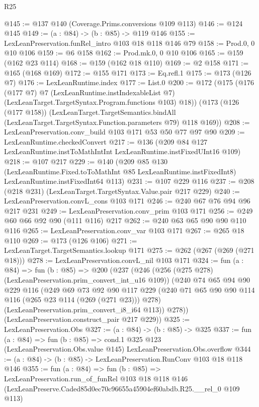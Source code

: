 \begin{lexlean}{R25}
\begin{coremodule}
@145 := @137 @140 (Coverage.Prims.conversions @109 @113)
@146 := @124 @145
@149 := (a : @84) -> (b : @85) -> @119 @146
@155 := LexLeanPreservation.funRel_intro @103 @18 @118 @146 @79
@158 := Prod.{0, 0} @10 @106
@159 := @6 @158
@162 := Prod.mk.{0, 0} @10 @106
@165 := @159 (@162 @23 @114)
@168 := @159 (@162 @18 @110)
@169 := @2 @158
@171 := @165 (@168 @169)
@172 := @155 @171
@173 := Eq.refl.{1}
@175 := @173 (@126 @7)
@176 := LexLeanRuntime.index
@177 := List.{0}
@200 := @172
    (@175
      (@176
        (@177 @7)
        @7
        (LexLeanRuntime.instIndexableList @7)
        (LexLeanTarget.TargetSyntax.Program.functions @103)
        @18))
    (@173
      (@126 (@177 @158))
      (LexLeanTarget.TargetSemantics.bindAll
        (LexLeanTarget.TargetSyntax.Function.parameters @79)
        @118
        @169))
@208 := LexLeanPreservation.conv_build @103 @171 @53 @50 @77 @97 @90
@209 := LexLeanRuntime.checkedConvert
@217 := @136 (@209 @84 @127 LexLeanRuntime.instToMathIntInt LexLeanRuntime.instFixedUInt16 @109)
@218 := @107 @217
@229 := @140
    (@209
      @85
      @130
      (LexLeanRuntime.Fixed.toToMathInt @85 LexLeanRuntime.instFixedInt8)
      LexLeanRuntime.instFixedInt64
      @113)
@231 := @107 @229 @116
@237 := @208 (@218 @231) (LexLeanTarget.TargetSyntax.Value.pair @217 @229)
@240 := LexLeanPreservation.convL_cons @103 @171
@246 := @240 @67 @76 @94 @96 @217 @231
@249 := LexLeanPreservation.conv_prim @103 @171
@256 := @249 @60 @66 @92 @90 (@111 @116) @217
@262 := @240 @63 @65 @90 @90 @110 @116
@265 := LexLeanPreservation.conv_var @103 @171
@267 := @265 @18 @110
@269 := @173 (@126 @106)
@271 := LexLeanTarget.TargetSemantics.lookup @171
@275 := @262 (@267 (@269 (@271 @18)))
@278 := LexLeanPreservation.convL_nil @103 @171
@324 := fun (a : @84) =>
  fun (b : @85) =>
  @200
    (@237
      (@246
        (@256 (@275 @278) (LexLeanPreservation.prim_convert_int_u16 @109))
        (@240
          @74
          @65
          @94
          @90
          @229
          @116
          (@249
            @69
            @73
            @92
            @90
            @117
            @229
            (@240 @71 @65 @90 @90 @114 @116 (@265 @23 @114 (@269 (@271 @23))) @278)
            (LexLeanPreservation.prim_convert_i8_i64 @113))
          @278))
      (LexLeanPreservation.construct_pair @217 @229))
@325 := LexLeanPreservation.Obs
@327 := (a : @84) -> (b : @85) -> @325
@337 := fun (a : @84) =>
  fun (b : @85) =>
  cond.{1} @325 @123 (LexLeanPreservation.Obs.value @145) LexLeanPreservation.Obs.overflow
@344 := (a : @84) -> (b : @85) -> LexLeanPreservation.RunConv @103 @18 @118 @146
@355 := fun (a : @84) =>
  fun (b : @85) =>
  LexLeanPreservation.run_of_funRel
    @103
    @18
    @118
    @146
    (LexLeanPreserve.Caded85d0ec70c96655a45904ef60abdb.R25.__rel_0 @109 @113)
\end{coremodule}
\end{lexlean}
